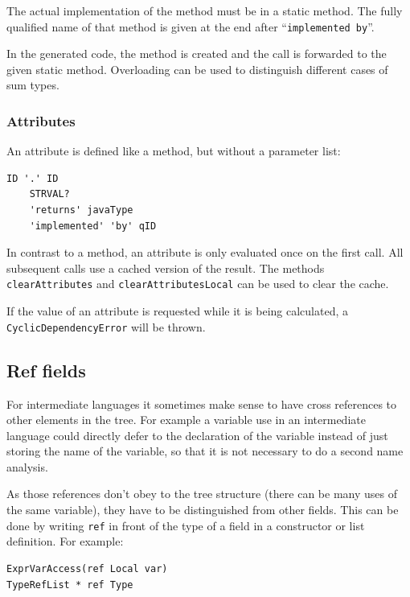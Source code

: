 \documentclass{scrartcl}
\begin{document}
The actual implementation of the method must be in a static method.
The fully qualified name of that method is given at the end after ``\lstinline!implemented by!''.

In the generated code, the method is created and the call is forwarded to the given static method.
Overloading can be used to distinguish different cases of sum types.



\subsubsection{Attributes}

An attribute is defined like a method, but without a parameter list:

\begin{lstlisting}
ID '.' ID
    STRVAL?
    'returns' javaType
    'implemented' 'by' qID
\end{lstlisting}

In contrast to a method, an attribute is only evaluated once on the first call.
All subsequent calls use a cached version of the result.
The methods \lstinline!clearAttributes! and \lstinline!clearAttributesLocal! can be used to clear the cache.

If the value of an attribute is requested while it is being calculated, a \lstinline!CyclicDependencyError! will be thrown.



\subsection{Ref fields}
\label{Refs}

For intermediate languages it sometimes make sense to have cross references to other elements in the tree.
For example a variable use in an intermediate language could directly defer to the declaration of the variable instead of just storing the name of the variable, so that it is not necessary to do a second name analysis.

As those references don't obey to the tree structure (there can be many uses of the same variable), they have to be distinguished from other fields.
This can be done by writing \lstinline!ref! in front of the type of a field in a constructor or list definition.
For example:

\begin{lstlisting}
ExprVarAccess(ref Local var)
TypeRefList * ref Type
\end{lstlisting}
\end{document}
